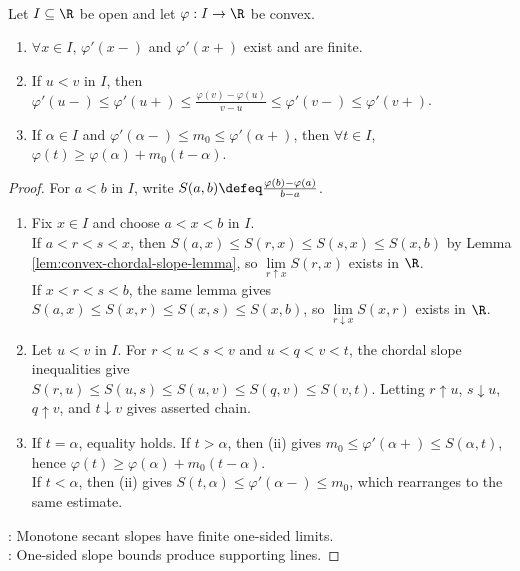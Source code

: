 \begin{lemma} \label{lem:convex-one-sided-derivatives-supporting-lines} \\
Let $I\subseteq\R$ be open and let $\varphi:I\to\R$ be convex.
\begin{enumerate}[label=(\roman*)]
\setlength{\itemsep}{0pt}
\item $\forall x\in I$, $\varphi'(x-)$ and $\varphi'(x+)$ exist and are finite.
\item If $u<v$ in $I$, then $\varphi'(u-)\leq\varphi'(u+)\leq\frac{\varphi(v)-\varphi(u)}{v-u}\leq\varphi'(v-)\leq\varphi'(v+)$.
\item If $\alpha\in I$ and $\varphi'(\alpha-)\leq m_0\leq\varphi'(\alpha+)$, then $\forall t\in I$, $\varphi(t)\geq\varphi(\alpha)+m_0(t-\alpha)$.
\end{enumerate}
\begin{proof}
For $a<b$ in $I$, write $S(a,b)\defeq\frac{\varphi(b)-\varphi(a)}{b-a}$.
\begin{enumerate}[label=(\roman*)]
\setlength{\itemsep}{0pt}
\item Fix $x\in I$ and choose $a<x<b$ in $I$.\\
If $a<r<s<x$, then $S(a,x)\leq S(r,x)\leq S(s,x)\leq S(x,b)$ by Lemma \ref{lem:convex-chordal-slope-lemma}, so $\lim\limits_{r\uparrow x}S(r,x)$ exists in $\R$.\\
If $x<r<s<b$, the same lemma gives $S(a,x)\leq S(x,r)\leq S(x,s)\leq S(x,b)$, so $\lim\limits_{r\downarrow x}S(x,r)$ exists in $\R$.
\item Let $u<v$ in $I$. For $r<u<s<v$ and $u<q<v<t$, the chordal slope inequalities give\\
$S(r,u)\leq S(u,s)\leq S(u,v)\leq S(q,v)\leq S(v,t)$. Letting $r\uparrow u$, $s\downarrow u$, $q\uparrow v$, and $t\downarrow v$ gives asserted chain.
\item If $t=\alpha$, equality holds. If $t>\alpha$, then (ii) gives $m_0\leq\varphi'(\alpha+)\leq S(\alpha,t)$, hence $\varphi(t)\geq\varphi(\alpha)+m_0(t-\alpha)$.\\
If $t<\alpha$, then (ii) gives $S(t,\alpha)\leq\varphi'(\alpha-)\leq m_0$, which rearranges to the same estimate.
\end{enumerate}
: Monotone secant slopes have finite one-sided limits.\\
: One-sided slope bounds produce supporting lines.
\end{proof}
\end{lemma}

